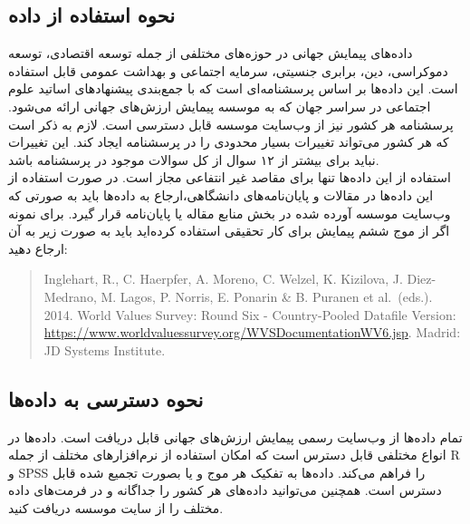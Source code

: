 \documentclass[
]{article}
\begin{document}
\hypertarget{ux646ux62dux648ux647-ux627ux633ux62aux641ux627ux62fux647-ux627ux632-ux62fux627ux62fux647}{%
\subsection{نحوه استفاده از
داده}\label{ux646ux62dux648ux647-ux627ux633ux62aux641ux627ux62fux647-ux627ux632-ux62fux627ux62fux647}}

داده‌های پیمایش جهانی در حوزه‌های مختلفی از جمله توسعه اقتصادی، توسعه
دموکراسی، دین، برابری جنسیتی، سرمایه اجتماعی و بهداشت عمومی قابل استفاده
است. این داده‌ها بر اساس پرسشنامه‌ای است که با جمع‌بندی پیشنهادهای اساتید
علوم اجتماعی در سراسر جهان که به موسسه پیمایش ارزش‌های جهانی ارائه می‌شود.
پرسشنامه هر کشور نیز از وب‌سایت موسسه قابل دسترسی است. لازم به ذکر است که
هر کشور می‌تواند تغییرات بسیار محدودی را در پرسشنامه ایجاد کند. این
تغییرات نباید برای بیشتر از ۱۲ سوال از کل سوالات موجود در پرسشنامه
باشد.\\
استفاده از این داده‌ها تنها برای مقاصد غیر انتفاعی مجاز است. در صورت
استفاده از این داده‌ها در مقالات و پایان‌نامه‌های دانشگاهی،ارجاع به داده‌ها
باید به صورتی که وب‌سایت موسسه آورده شده در بخش منابع مقاله یا پایان‌نامه
قرار‌ گیرد. برای نمونه اگر از موج ششم پیمایش برای کار تحقیقی استفاده
کرده‌اید باید به صورت زیر به آن ارجاع دهید:

\begin{quote}
Inglehart, R., C. Haerpfer, A. Moreno, C. Welzel, K. Kizilova, J.
Diez-Medrano, M. Lagos, P. Norris, E. Ponarin \& B. Puranen et
al.~(eds.). 2014. World Values Survey: Round Six - Country-Pooled
Datafile Version:
\url{https://www.worldvaluessurvey.org/WVSDocumentationWV6.jsp}. Madrid:
JD Systems Institute.
\end{quote}

\hypertarget{ux646ux62dux648ux647-ux62fux633ux62aux631ux633ux6cc-ux628ux647-ux62fux627ux62fux647ux647ux627}{%
\subsection{نحوه دسترسی به
داده‌ها}\label{ux646ux62dux648ux647-ux62fux633ux62aux631ux633ux6cc-ux628ux647-ux62fux627ux62fux647ux647ux627}}

تمام داده‌ها از وب‌سایت رسمی پیمایش ارزش‌های جهانی قابل دریافت است. داده‌ها
در انواع مختلفی قابل دسترس است که امکان استفاده از نرم‌افزار‌های مختلف از
جمله R و SPSS را فراهم می‌کند. داده‌ها به تفکیک هر موج و یا بصورت تجمیع
شده قابل دسترس است. همچنین می‌توانید داده‌های هر کشور را جداگانه و در
فرمت‌های داده مختلف را از سایت موسسه دریافت کنید.
\end{document}
